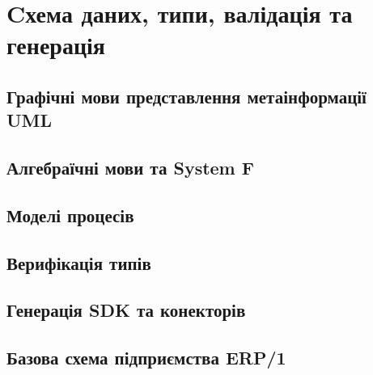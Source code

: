 \chapter{Cхема даних, типи, валідація та генерація}

\section{Графічні мови представлення метаінформації UML}

\section{Алгебраїчні мови та System F}

\section{Моделі процесів}

\section{Верифікація типів}

\section{Генерація SDK та конекторів}

\section{Базова схема підприємства ERP/1}

